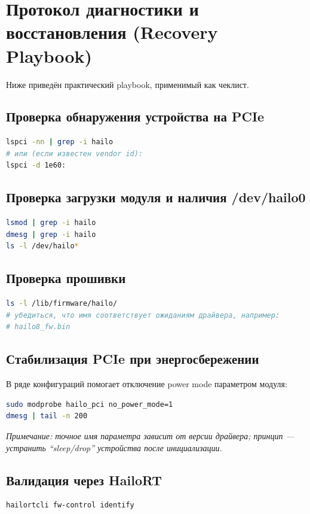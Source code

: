\documentclass[11pt,a4paper]{article}
\begin{document}
\section{Протокол диагностики и восстановления (Recovery Playbook)}
Ниже приведён практический playbook, применимый как чеклист.

\subsection{Проверка обнаружения устройства на PCIe}
\begin{lstlisting}[language=bash,caption={Проверка видимости Hailo по PCIe}]
lspci -nn | grep -i hailo
# или (если известен vendor id):
lspci -d 1e60:
\end{lstlisting}

\subsection{Проверка загрузки модуля и наличия /dev/hailo0}
\begin{lstlisting}[language=bash,caption={Проверка драйвера и устройства}]
lsmod | grep -i hailo
dmesg | grep -i hailo
ls -l /dev/hailo*
\end{lstlisting}

\subsection{Проверка прошивки}
\begin{lstlisting}[language=bash,caption={Проверка пути прошивки}]
ls -l /lib/firmware/hailo/
# убедиться, что имя соответствует ожиданиям драйвера, например:
# hailo8_fw.bin
\end{lstlisting}

\subsection{Стабилизация PCIe при энергосбережении}
В ряде конфигураций помогает отключение power mode параметром модуля:
\begin{lstlisting}[language=bash,caption={Отключение режима энергосбережения для стабилизации линка (пример)}]
sudo modprobe hailo_pci no_power_mode=1
dmesg | tail -n 200
\end{lstlisting}
\noindent
\textit{Примечание: точное имя параметра зависит от версии драйвера; принцип — устранить “sleep/drop” устройства после инициализации.}

\subsection{Валидация через HailoRT}
\begin{lstlisting}[language=bash,caption={Проверка идентификации устройства через HailoRT}]
hailortcli fw-control identify
\end{lstlisting}
\end{document}
